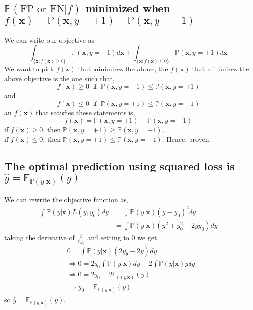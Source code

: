 \begin{appendices}
\subsection{\texorpdfstring{$\mathbb{P}( \text{FP or FN} |f)$}{TEXT} minimized when \texorpdfstring{$f(\bm{x}) = \mathbb{P}(\bm{x},y=+1) - \mathbb{P}(\bm{x},y=-1)$}{TEXT} } \label{proof:bayes-optimal-classifier}
We can write our objective as,
\begin{equation}
    \int_{\{\bm{x} : f(\bm{x}) \geq 0\}} \mathbb{P}(\bm{x},y=-1) d\bm{x} + \int_{\{\bm{x} : f(\bm{x}) \leq 0\}} \mathbb{P}(\bm{x},y=+1) d\bm{x}
\end{equation}
We want to pick $f(\bm{x})$ that minimizes the above, the $f(\bm{x})$ that minimizes the above objective is the one such that,
\begin{equation}
    f(\bm{x}) \geq 0 \; \; \text{if} \; \; \mathbb{P}(\bm{x},y=-1) \leq \mathbb{P}(\bm{x},y=+1) 
\end{equation}
and
\begin{equation}
    f(\bm{x}) \leq 0 \; \; \text{if} \; \; \mathbb{P}(\bm{x},y=+1) \leq \mathbb{P}(\bm{x},y=-1) 
\end{equation}
an $f(\bm{x})$ that satisfies these statements is,
\begin{equation}
    f(\bm{x}) = \mathbb{P}(\bm{x},y=+1) - \mathbb{P}(\bm{x},y=-1)
\end{equation}
if $f(\bm{x}) \geq 0$, then $\mathbb{P}(\bm{x},y=+1) \geq \mathbb{P}(\bm{x},y=-1)$, \\
if $f(\bm{x}) \leq 0$, then $\mathbb{P}(\bm{x},y=+1) \leq \mathbb{P}(\bm{x},y=-1)$. Hence, proven.

\subsection{The optimal prediction using squared loss is \texorpdfstring{$\hat{y} = \mathbb{E}_{\mathbb{P}(y| \bm{x})} (y)$}{TEXT}} \label{proof:squared-loss-optimal-classifier}
We can rewrite the objective function as,
\begin{align}
    \int \mathbb{P} (y| \bm{x}) L(y,y_{0}) dy &{} = \int \mathbb{P} (y| \bm{x}) (y - y_{0})^{2} dy \\
    & = \int \mathbb{P} (y| \bm{x}) (y^{2} +y_{0}^{2} -2yy_{0}) dy
\end{align}
taking the derivative of $\frac{\partial}{\partial y_{0}}$ and setting to 0 we get,
\begin{align}
    &{} 0 = \int \mathbb{P}(y| \bm{x}) (2y_{0} - 2y) dy \\
    & \Rightarrow 0 = 2y_{0} \int \mathbb{P}(y|\bm{x}) dy - 2 \int \mathbb{P}(y| \bm{x}) y dy \\
    & \Rightarrow 0 = 2y_{0} - 2 \mathbb{E}_{\mathbb{P}(y|\bm{x})} (y) \\
    & \Rightarrow y_{0} = \mathbb{E}_{\mathbb{P}(y| \bm{x})} (y)
\end{align}
so $\hat{y} = \mathbb{E}_{\mathbb{P}(y| \bm{x})} (y)$.


\end{appendices}
